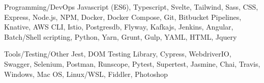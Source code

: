 

\begin{cvskills}

  \cvskill
    {Programming/DevOps} %
    {Javascript (ES6), Typescript, Svelte, Tailwind, Sass, CSS, Express, Node.js, NPM, Docker, Docker Compose, Git, Bitbucket Pipelines, Knative, AWS CLI, Istio, Postgresdb, Flyway, Kafkajs, Jenkins, Angular, Batch/Shell scripting, Python, Yarn, Grunt, Gulp, YAML, HTML, Jquery} %

  \cvskill
    {Tools/Testing/Other} %
    {Jest, DOM Testing Library, Cypress, WebdriverIO, Swagger, Selenium, Postman, Runscope, Pytest, Supertest, Jasmine, Chai, Travis, Windows, Mac OS, Linux/WSL, Fiddler, Photoshop} %

\end{cvskills}
